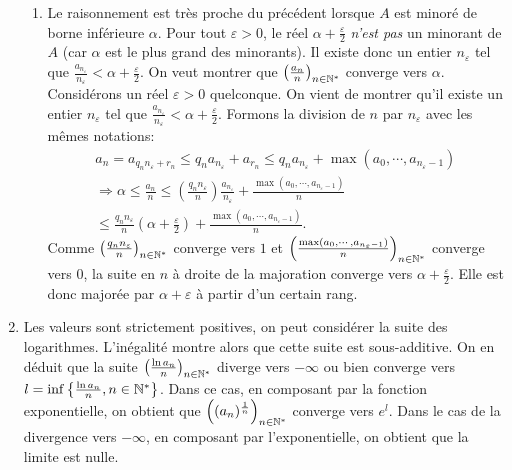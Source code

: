 \begin{enumerate}
\begin{enumerate}
 \item Le raisonnement est très proche du précédent lorsque $A$ est minoré de borne inférieure $\alpha$. Pour tout $\varepsilon>0$, le réel $\alpha +\frac{\varepsilon}{2}$ \emph{n'est pas} un minorant de $A$ (car $\alpha$ est le plus grand des minorants). Il existe donc un entier $n_\varepsilon$ tel que $\frac{a_{n_\varepsilon}}{n_\varepsilon}<\alpha +\frac{\varepsilon}{2}$.\newline
On veut montrer que $\left( \frac{a_n}{n}\right) _{n\in \mathbb{N}^*}$ converge vers $\alpha$. Considérons un réel $\varepsilon >0$ quelconque.\newline
On vient de montrer qu'il existe un entier $n_\varepsilon$ tel que $\frac{a_{n_\varepsilon}}{n_\varepsilon}<\alpha +\frac{\varepsilon}{2}$. Formons la division de $n$ par $n_\varepsilon$ avec les mêmes notations:
\begin{multline*}
 a_n = a_{q_n n_\varepsilon + r_n}
\leq q_n a_{n_\varepsilon} + a_{r_n}
\leq q_n a_{n_\varepsilon} + \max(a_0,\cdots,a_{n_\varepsilon-1})\\
\Rightarrow
\alpha \leq \frac{a_n}{n}\leq (\frac{q_n n_\varepsilon}{n}) \frac{a_{n_\varepsilon}}{n_\varepsilon}+\frac{\max(a_0,\cdots,a_{n_\varepsilon-1})}{n}\\
\leq \frac{q_n n_\varepsilon}{n}\left( \alpha +\frac{\varepsilon}{2}\right) + \frac{\max(a_0,\cdots,a_{n_\varepsilon-1})}{n}.
\end{multline*}
Comme $\left( \frac{q_n n_\varepsilon}{n}\right)_{n\in \mathbb{N}^*}$ converge vers $1$ et $\left( \frac{\max(a_0,\cdots,a_{n_\varepsilon-1})}{n}\right)_{n\in \mathbb{N}^*}$ converge vers $0$, la suite en $n$ à droite de la majoration converge vers $\alpha + \frac{\varepsilon}{2}$. Elle est donc majorée par $\alpha + \varepsilon$ à partir d'un certain rang. 
\end{enumerate}

\item Les valeurs sont strictement positives, on peut considérer la suite des logarithmes. L'inégalité montre alors que cette suite est sous-additive.\newline
On en déduit que la suite $\left( \frac{\ln a_n}{n}\right)_{n\in \mathbb{N}^*}$ diverge vers $-\infty$ ou bien converge vers 
$l=\inf\left\lbrace \frac{\ln a_n}{n}, n\in \mathbb{N}^*\right\rbrace$. Dans ce cas, en composant par la fonction exponentielle, on obtient que
$\left( (a_n)^\frac{1}{n}\right) _{n\in \mathbb{N}^*}$ converge vers $e^l$.\newline
Dans le cas de la divergence vers $-\infty$, en composant par l'exponentielle, on obtient que la limite est nulle.
\end{enumerate}

